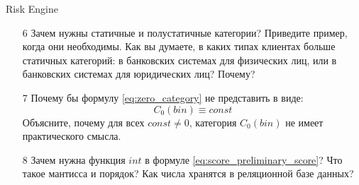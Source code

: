 \begin{frame}{Risk Engine}
	\small
	\begin{enumerate}
		\item[6] Зачем нужны статичные и полустатичные категории? Приведите пример, когда они необходимы.
		Как вы думаете, в каких типах клиентах больше статичных категорий: в банковских системах для физических лиц, или в банковских системах для юридических лиц? Почему?
		\item[7] Почему бы формулу \eqref{eq:zero_category} не представить в виде:
		\begin{equation*}
		C_0 (bin) \equiv const
		\end{equation*}
		Объясните, почему для всех $const \neq 0$, категория $C_0 (bin)$ не имеет практического смысла.
		\item[8] Зачем нужна функция $int$ в формуле \eqref{eq:score_preliminary_score}? Что 
		такое мантисса и порядок? Как числа хранятся в реляционной базе данных?
	\end{enumerate}
\end{frame}




